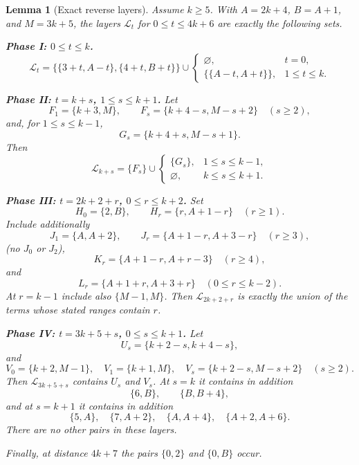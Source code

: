 \documentclass[11pt]{article}
\newtheorem{lemma}{Lemma}
\theoremstyle{definition}
\theoremstyle{remark}
\begin{document}
\begin{lemma}[Exact reverse layers]\label{lem:layers}
Assume $k\ge5$. With $A=2k+4$, $B=A+1$, and $M=3k+5$, the layers $\mathcal L_t$ for $0\le t\le4k+6$ are exactly the following sets.

\medskip
\noindent\textbf{Phase I: $0\le t\le k$.}
\[
\mathcal L_t=
\bigl\{\{3+t,A-t\},\{4+t,B+t\}\bigr\}
\cup
\begin{cases}
\varnothing,&t=0,\\
\{\{A-t,A+t\}\},&1\le t\le k.
\end{cases}
\]

\medskip
\noindent\textbf{Phase II: $t=k+s$, $1\le s\le k+1$.}
Let
\[
F_1=\{k+3,M\},\qquad
F_s=\{k+4-s,M-s+2\}\quad(s\ge2),
\]
and, for $1\le s\le k-1$,
\[
G_s=\{k+4+s,M-s+1\}.
\]
Then
\[
\mathcal L_{k+s}=\{F_s\}\cup
\begin{cases}
\{G_s\},&1\le s\le k-1,\\
\varnothing,&k\le s\le k+1.
\end{cases}
\]

\medskip
\noindent\textbf{Phase III: $t=2k+2+r$, $0\le r\le k+2$.}
Set
\[
H_0=\{2,B\},\qquad H_r=\{r,A+1-r\}\quad(r\ge1).
\]
Include additionally
\[
J_1=\{A,A+2\},\qquad
J_r=\{A+1-r,A+3-r\}\quad(r\ge3),
\]
(no $J_0$ or $J_2$),
\[
K_r=\{A+1-r,A+r-3\}\quad(r\ge4),
\]
and
\[
L_r=\{A+1+r,A+3+r\}\quad(0\le r\le k-2).
\]
At $r=k-1$ include also $\{M-1,M\}$. Then $\mathcal L_{2k+2+r}$ is exactly the union of the terms whose stated ranges contain $r$.

\medskip
\noindent\textbf{Phase IV: $t=3k+5+s$, $0\le s\le k+1$.}
Let
\[
U_s=\{k+2-s,k+4-s\},
\]
and
\[
V_0=\{k+2,M-1\},\quad
V_1=\{k+1,M\},\quad
V_s=\{k+2-s,M-s+2\}\quad(s\ge2).
\]
Then $\mathcal L_{3k+5+s}$ contains $U_s$ and $V_s$. At $s=k$ it contains in addition
\[
\{6,B\},\qquad \{B,B+4\},
\]
and at $s=k+1$ it contains in addition
\[
\{5,A\},\quad \{7,A+2\},\quad \{A,A+4\},\quad \{A+2,A+6\}.
\]
There are no other pairs in these layers.

Finally, at distance $4k+7$ the pairs $\{0,2\}$ and $\{0,B\}$ occur.
\end{lemma}
\end{document}
